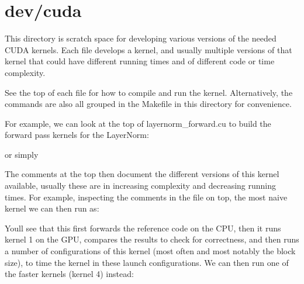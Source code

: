 \chapter{dev/cuda}
\hypertarget{md_OriginalStuff_2dev_2cuda_2README}{}\label{md_OriginalStuff_2dev_2cuda_2README}
\label{md_OriginalStuff_2dev_2cuda_2README_autotoc_md93}%
%


This directory is scratch space for developing various versions of the needed CUDA kernels. Each file develops a kernel, and usually multiple versions of that kernel that could have different running times and of different code or time complexity.

See the top of each file for how to compile and run the kernel. Alternatively, the commands are also all grouped in the {\ttfamily Makefile} in this directory for convenience.

For example, we can look at the top of {\ttfamily layernorm\+\_\+forward.\+cu} to build the forward pass kernels for the Layer\+Norm\+:


\begin{DoxyCode}{0}

\end{DoxyCode}


or simply


\begin{DoxyCode}{0}

\end{DoxyCode}


The comments at the top then document the different versions of this kernel available, usually these are in increasing complexity and decreasing running times. For example, inspecting the comments in the file on top, the most naive kernel we can then run as\+:


\begin{DoxyCode}{0}

\end{DoxyCode}


You\textquotesingle{}ll see that this first forwards the reference code on the CPU, then it runs kernel 1 on the GPU, compares the results to check for correctness, and then runs a number of configurations of this kernel (most often and most notably the block size), to time the kernel in these launch configurations. We can then run one of the faster kernels (kernel 4) instead\+:


